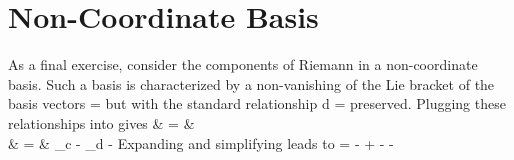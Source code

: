 \documentclass[12pt]{article}
\begin{document}
\section{Non-Coordinate Basis}
As a final exercise, consider the components of Riemann in a non-coordinate basis.
Such a basis is characterized by a non-vanishing of the Lie bracket of the basis vectors
\be
{} =   \eqp
\ee
but with the standard relationship
\be
  d  =   
\ee
preserved.
Plugging these relationships into  gives
\bea
   & = &  \nonumber \\
                          & = & 
                                {   \nabla_c 
                                  - \nabla_d  }
                                - \eqp
\eea
Expanding and simplifying leads to
\be
   =    - 
                            +  - 
                            -  
\ee
\end{document}
